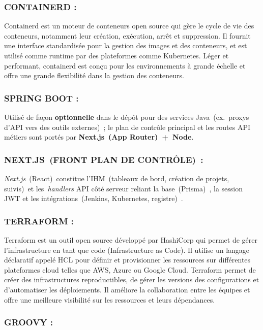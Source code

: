 \subsubsection{CONTAINERD :}

Containerd est un moteur de conteneurs open source qui gère le cycle de vie des conteneurs, notamment leur création, exécution, arrêt et suppression. Il fournit une interface standardisée pour la gestion des images et des conteneurs, et est utilisé comme runtime par des plateformes comme Kubernetes. Léger et performant, containerd est conçu pour les environnements à grande échelle et offre une grande flexibilité dans la gestion des conteneurs.

\subsubsection{SPRING BOOT :}

Utilisé de façon \textbf{optionnelle} dans le dépôt pour des services Java~(ex.\ proxys d’API vers des outils externes)~; le plan de contrôle principal et les routes API métiers sont portés par \textbf{Next.js~(App Router)~+~Node}.

\subsubsection{NEXT.JS~(FRONT PLAN DE CONTRÔLE)~:}

\textit{Next.js}~(React)~constitue l’IHM~(tableaux de bord, création de projets, suivis)~et les~\emph{handlers} API côté serveur reliant la base~(Prisma)~, la session JWT et les intégrations~(Jenkins, Kubernetes, registre)~.

\subsubsection{TERRAFORM :}

Terraform est un outil open source développé par HashiCorp qui permet de gérer l’infrastructure en tant que code (Infrastructure as Code). Il utilise un langage déclaratif appelé HCL pour définir et provisionner les ressources sur différentes plateformes cloud telles que AWS, Azure ou Google Cloud. Terraform permet de créer des infrastructures reproductibles, de gérer les versions des configurations et d’automatiser les déploiements. Il améliore la collaboration entre les équipes et offre une meilleure visibilité sur les ressources et leurs dépendances.

\subsubsection{GROOVY :}

